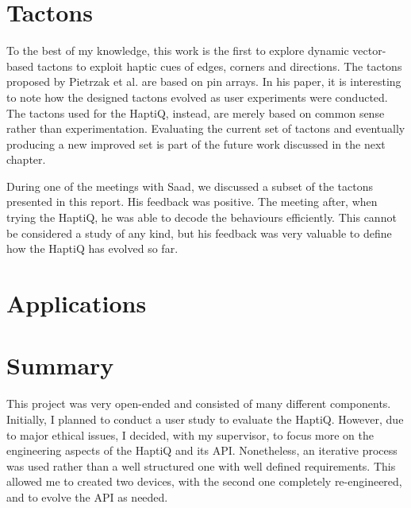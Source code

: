 
\section{Tactons}

To the best of my knowledge, this work is the first to explore dynamic vector-based tactons to exploit haptic cues of edges, corners and directions. The tactons proposed by Pietrzak et al. \cite{pietrzak2009creating} are based on pin arrays. In his paper, it is interesting to note how the designed tactons evolved as user experiments were conducted. The tactons used for the HaptiQ, instead, are merely based on common sense rather than experimentation. Evaluating the current set of tactons and eventually producing a new improved set is part of the future work discussed in the next chapter.

During one of the meetings with Saad, we discussed a subset of the tactons presented in this report. His feedback was positive. The meeting after, when trying the HaptiQ, he was able to decode the behaviours efficiently. This cannot be considered a study of any kind, but his feedback was very valuable to define how the HaptiQ has evolved so far. 

\section{Applications}


\section{Summary}

This project was very open-ended and consisted of many different components. Initially, I planned to conduct a user study to evaluate the HaptiQ. However, due to major ethical issues, I decided, with my supervisor, to focus more on the engineering aspects of the HaptiQ and its API. Nonetheless, an iterative process was used rather than a well structured one with well defined requirements. This allowed me to created two devices, with the second one completely re-engineered, and to evolve the API as needed.    

